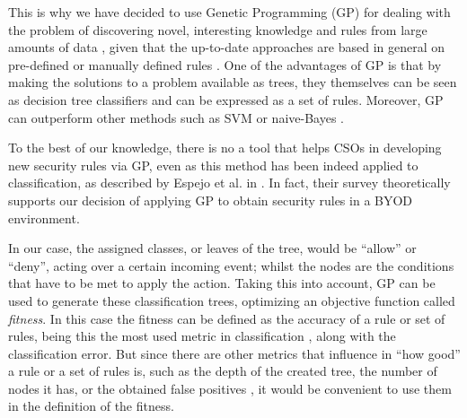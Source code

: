 \documentclass[runningheads]{llncs}
\begin{document}
This is why we have decided to use Genetic Programming (GP) for
dealing with the problem of discovering novel, interesting knowledge
and rules from large amounts of data \cite{freitas2002data}, given
that the up-to-date approaches are based in general on pre-defined or
manually defined rules \cite{ali2015analysis}. One of
the advantages of GP is that by making the solutions to a problem
available as trees, they themselves can be seen as decision
tree classifiers \cite{safavian1990survey} and can be expressed as a
set of rules. Moreover, GP can outperform other methods such as SVM or naive-Bayes \cite{Castellanos19Medical}.

To the best of our knowledge, there is no a tool that helps CSOs in
developing new security rules via GP, even as this method has been
indeed applied to classification, as described by Espejo et al. in
\cite{espejo2010survey}. In fact, their survey theoretically supports our
decision of applying GP to obtain security rules in a BYOD
environment.

In our case, the assigned classes, or leaves of the tree, would be ``allow''
or ``deny'', acting over a certain incoming event; whilst the nodes
are the conditions that have to be met to apply the action. Taking
this into account, GP can be used to generate these classification
trees, optimizing an objective function called {\em fitness}. In this case the
fitness can be defined as the accuracy of a rule or set of rules, being this the most
used metric in classification \cite{witten2005data}, along with the
classification error. But since there are other metrics that influence in
``how good'' a rule or a set of rules is, such as the depth of the
created tree, the number of nodes it has, or the obtained false positives
\cite{back1996evolutionary}, it would be convenient to use them in
the definition of the fitness.
\end{document}
